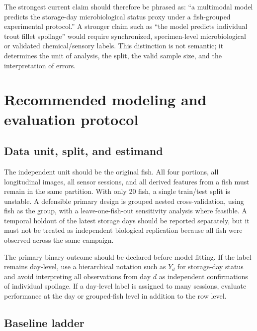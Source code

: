 \documentclass[11pt]{article}
\begin{document}
The strongest current claim should therefore be phrased as: ``a multimodal model predicts the storage-day microbiological status proxy under a fish-grouped experimental protocol.'' A stronger claim such as ``the model predicts individual trout fillet spoilage'' would require synchronized, specimen-level microbiological or validated chemical/sensory labels. This distinction is not semantic; it determines the unit of analysis, the split, the valid sample size, and the interpretation of errors.

\section{Recommended modeling and evaluation protocol}

\subsection{Data unit, split, and estimand}

The independent unit should be the original fish. All four portions, all longitudinal images, all sensor sessions, and all derived features from a fish must remain in the same partition. With only 20 fish, a single train/test split is unstable. A defensible primary design is grouped nested cross-validation, using fish as the group, with a leave-one-fish-out sensitivity analysis where feasible. A temporal holdout of the latest storage days should be reported separately, but it must not be treated as independent biological replication because all fish were observed across the same campaign.

The primary binary outcome should be declared before model fitting. If the label remains day-level, use a hierarchical notation such as $Y_d$ for storage-day status and avoid interpreting all observations from day $d$ as independent confirmations of individual spoilage. If a day-level label is assigned to many sessions, evaluate performance at the day or grouped-fish level in addition to the row level.

\subsection{Baseline ladder}
\end{document}
